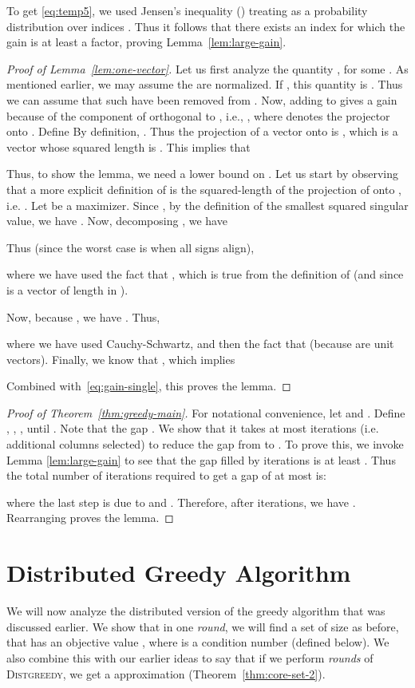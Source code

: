\documentclass{article}
\newcommand{\distgreedy}{\textsc{Distgreedy}}
\begin{document}
To get \eqref{eq:temp5}, we used Jensen's inequality () treating  as a probability distribution over indices . Thus it follows that there exists an index  for which the gain is at least a  factor, proving Lemma~\ref{lem:large-gain}.


\begin{proof}[Proof of Lemma~\ref{lem:one-vector}]
Let us first analyze the quantity , for some .  As mentioned earlier, we may assume the  are normalized. If , this quantity is . Thus we can assume that such  have been removed from . Now, adding  to  gives a gain because of the component of  orthogonal to , i.e., , where  denotes the projector onto . Define
 By definition, . Thus the projection of a vector  onto  is , which is a vector whose squared length is
.
This implies that


Thus, to show the lemma, we need a lower bound on . Let us start by observing
that a more explicit definition of  is the squared-length of the projection of  onto , i.e. . Let  be a maximizer. Since , by the definition of the smallest squared singular value, we have .  Now, decomposing , we have

Thus (since the worst case is when all signs align),

where we have used the fact that , which is true from the definition of  (and since  is a vector of length  in ). 

Now, because , we have . Thus,

where we have used Cauchy-Schwartz, and then the fact that  (because  are unit vectors). Finally, we know that , which implies 

Combined with~\eqref{eq:gain-single}, this proves the lemma. 
\end{proof}


 \begin{proof}[Proof of Theorem~\ref{thm:greedy-main}]
 For notational convenience, let  and . Define , , ,  until . Note that the gap . We show that it takes at most  iterations (i.e. additional columns selected) to reduce the gap from  to . To prove this, we invoke Lemma \ref{lem:large-gain} to see that the gap filled by  iterations is at least . Thus the total number of iterations  required to get a gap of at most  is:
\vspace{-0.1cm}

 where the last step is due to  and . Therefore, after  iterations, we have . Rearranging proves the lemma.
 \end{proof}


\section{Distributed Greedy Algorithm} \label{section-4}
We will now analyze the distributed version of the greedy algorithm that was discussed earlier. We show that in one {\em round}, we will find a set of size  as before, that has an objective value , where  is a condition number (defined below). We also combine this with our earlier ideas to say that if we perform  {\em rounds} of \distgreedy, we get a  approximation (Theorem~\ref{thm:core-set-2}).
\end{document}
